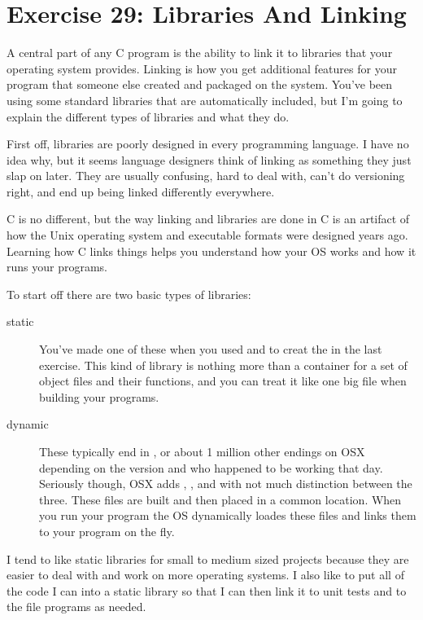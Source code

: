 \chapter{Exercise 29: Libraries And Linking}

A central part of any C program is the ability to link it to libraries that
your operating system provides.  Linking is how you get additional features
for your program that someone else created and packaged on the system.  You've
been using some standard libraries that are automatically included, but I'm
going to explain the different types of libraries and what they do.

First off, libraries are poorly designed in every programming language.  I have 
no idea why, but it seems language designers think of linking as something they
just slap on later.  They are usually confusing, hard to deal with, can't do
versioning right, and end up being linked differently everywhere.

C is no different, but the way linking and libraries are done in C is an artifact
of how the Unix operating system and executable formats were designed years ago.
Learning how C links things helps you understand how your OS works and how it
runs your programs.

To start off there are two basic types of libraries:

\begin{description}
\item[static] You've made one of these when you used  and 
    to creat the  in the last exercise.  This kind of library
    is nothing more than a container for a set of  object files and their
    functions, and you can treat it like one big  file when building 
    your programs.
\item[dynamic] These typically end in ,  or about 1 million other
    endings on OSX depending on the version and who happened to be working that day.
    Seriously though, OSX adds , , and  with not much distinction between the three. These files are built and then placed
    in a common location.  When you run your program the OS dynamically loades these
    files and links them to your program on the fly.
\end{description}

I tend to like static libraries for small to medium sized projects because they are
easier to deal with and work on more operating systems.  I also like to put all of the
code I can into a static library so that I can then link it to unit tests and to the
file programs as needed.

